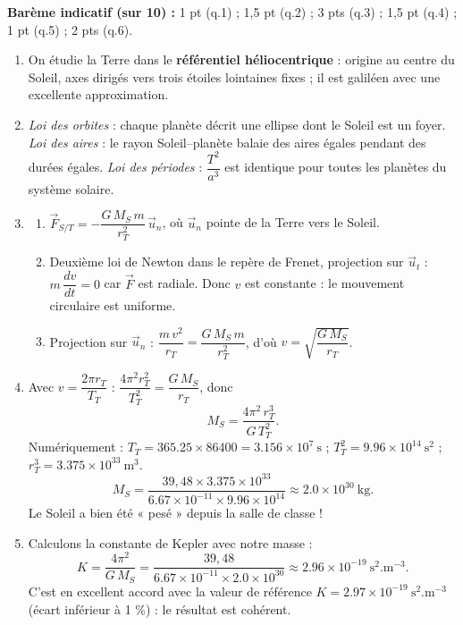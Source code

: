 \documentclass[11pt]{article}
\begin{document}
\begin{corrige}
\textbf{Barème indicatif (sur 10) :} 1 pt (q.1) ; 1,5 pt (q.2) ; 3 pts (q.3) ; 1,5 pt (q.4) ; 1 pt (q.5) ; 2 pts (q.6).

\begin{enumerate}
\item On étudie la Terre dans le \textbf{référentiel héliocentrique} : origine au centre du Soleil, axes dirigés vers trois étoiles lointaines fixes ; il est galiléen avec une excellente approximation.
\item \emph{Loi des orbites} : chaque planète décrit une ellipse dont le Soleil est un foyer. \emph{Loi des aires} : le rayon Soleil--planète balaie des aires égales pendant des durées égales. \emph{Loi des périodes} : $\dfrac{T^2}{a^3}$ est identique pour toutes les planètes du système solaire.
\item 
\begin{enumerate}
\item $\vec{F}_{S/T} = -\dfrac{G\,M_S\,m}{r_T^2}\,\vec{u}_n$, où $\vec{u}_n$ pointe de la Terre vers le Soleil.
\item Deuxième loi de Newton dans le repère de Frenet, projection sur $\vec{u}_t$ : $m\,\dfrac{dv}{dt} = 0$ car $\vec{F}$ est radiale. Donc $v$ est constante : le mouvement circulaire est uniforme.
\item Projection sur $\vec{u}_n$ : $\dfrac{m\,v^2}{r_T} = \dfrac{G\,M_S\,m}{r_T^2}$, d'où $v = \sqrt{\dfrac{G\,M_S}{r_T}}$.
\end{enumerate}
\item Avec $v = \dfrac{2\pi r_T}{T_T}$ : $\dfrac{4\pi^2 r_T^2}{T_T^2} = \dfrac{G\,M_S}{r_T}$, donc
\[ M_S = \dfrac{4\pi^2\,r_T^3}{G\,T_T^2}. \]
Numériquement : $T_T = \num{365,25}\times\num{86400} = \num{3,156}\times 10^{7}\ \mathrm{s}$ ; $T_T^2 = \num{9,96}\times 10^{14}\ \mathrm{s^2}$ ; $r_T^3 = \num{3,375}\times 10^{33}\ \mathrm{m^3}$.
\[ M_S = \dfrac{39,48 \times \num{3,375}\times 10^{33}}{\num{6,67}\times 10^{-11} \times \num{9,96}\times 10^{14}} \approx \num{2,0}\times 10^{30}\ \mathrm{kg}. \]
Le Soleil a bien été « pesé » depuis la salle de classe !
\item Calculons la constante de Kepler avec notre masse :
\[ K = \dfrac{4\pi^2}{G\,M_S} = \dfrac{39,48}{\num{6,67}\times 10^{-11} \times \num{2,0}\times 10^{30}} \approx \num{2,96}\times 10^{-19}\ \mathrm{s^2.m^{-3}}. \]
C'est en excellent accord avec la valeur de référence $K = \num{2,97}\times 10^{-19}\ \mathrm{s^2.m^{-3}}$ (écart inférieur à 1 \%) : le résultat est cohérent.

\end{enumerate}
\end{corrige}
\end{document}
